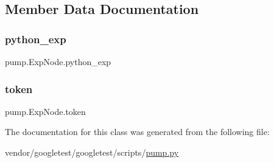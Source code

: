 \subsection{Member Data Documentation}
\mbox{\label{classpump_1_1_exp_node_adccfe4778c2e34f6b2c88118c0f1587f}} 
\subsubsection{\texorpdfstring{python\+\_\+exp}{python\_exp}}
{\footnotesize\ttfamily pump.\+Exp\+Node.\+python\+\_\+exp}

\mbox{\label{classpump_1_1_exp_node_ade05a5a32535d717dc5c194569aaf356}} 
\subsubsection{\texorpdfstring{token}{token}}
{\footnotesize\ttfamily pump.\+Exp\+Node.\+token}



The documentation for this class was generated from the following file\+:\begin{DoxyCompactItemize}
\item 
vendor/googletest/googletest/scripts/\hyperlink{pump_8py}{pump.\+py}\end{DoxyCompactItemize}

